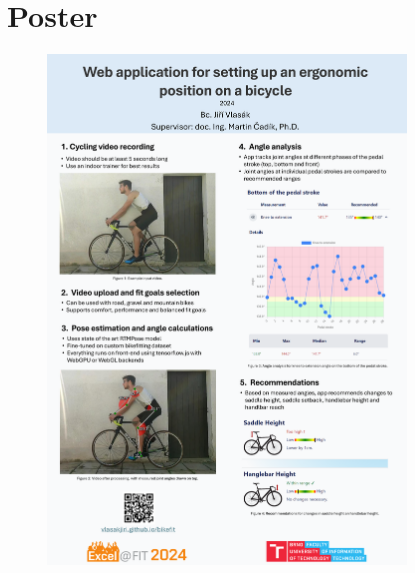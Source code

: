 
% 





\chapter{Poster}

\begin{figure}[H]
    \centering
    \includegraphics[width=0.85\textwidth]{obrazky-figures/excel.pdf}
    \label{fig:poster}
\end{figure}


% 
